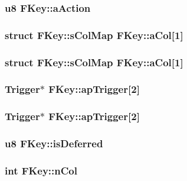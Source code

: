 \subsubsection{\setlength{\rightskip}{0pt plus 5cm}\bf{u8} \bf{FKey::a\-Action}}\label{structFKey_b46a3c738f70638b52eb9c94a81b2713}


\subsubsection{\setlength{\rightskip}{0pt plus 5cm}struct \bf{FKey::s\-Col\-Map}  \bf{FKey::a\-Col}[1]}\label{structFKey_70effaf6dd285bce0867ce8de1d5c61d}


\subsubsection{\setlength{\rightskip}{0pt plus 5cm}struct \bf{FKey::s\-Col\-Map}  \bf{FKey::a\-Col}[1]}\label{structFKey_70effaf6dd285bce0867ce8de1d5c61d}


\subsubsection{\setlength{\rightskip}{0pt plus 5cm}\bf{Trigger}$\ast$ \bf{FKey::ap\-Trigger}[2]}\label{structFKey_bd56baa50a8f453c3ff7574e6776a70e}


\subsubsection{\setlength{\rightskip}{0pt plus 5cm}\bf{Trigger}$\ast$ \bf{FKey::ap\-Trigger}[2]}\label{structFKey_bd56baa50a8f453c3ff7574e6776a70e}


\subsubsection{\setlength{\rightskip}{0pt plus 5cm}\bf{u8} \bf{FKey::is\-Deferred}}\label{structFKey_1c070498c2ca407c0037b7b42df7ce3e}


\subsubsection{\setlength{\rightskip}{0pt plus 5cm}int \bf{FKey::n\-Col}}\label{structFKey_1e194c08d6617d2d7d24071d0227a8a8}


